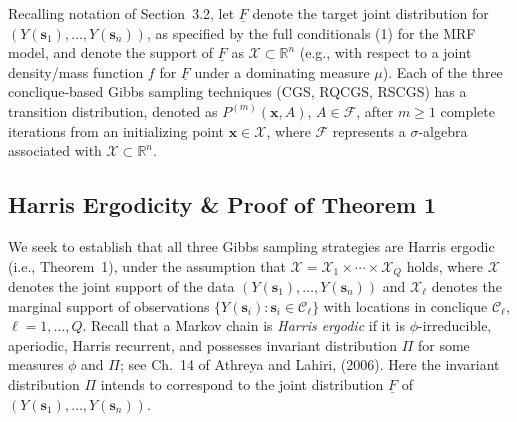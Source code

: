 \documentclass[12pt]{article}
\theoremstyle{definition}
\begin{document}
  Recalling   notation of Section~3.2, let $\underline{F}$ denote the target joint distribution  for $(Y(\boldsymbol s_1), \dots, Y(\boldsymbol s_n))$, as
specified by the full conditionals (1) for the MRF model, and denote the support  of  $\underline{F}$ as $\mathcal{X} \subset \mathbb{R}^n$   (e.g., with respect to a joint density/mass function $ f$ for $\underline{F}$  under a dominating measure $\mu$).
Each of the three conclique-based Gibbs sampling techniques (CGS, RQCGS, RSCGS) has a  transition distribution, denoted as  \(P^{(m)}(\boldsymbol  x, A)\), \(A\in\mathcal{F}\),  after \(m \geq 1\)
complete iterations from an initializing point \(\boldsymbol  x \in \mathcal{X}\),
where \(\mathcal{F}\) represents a  \(\sigma\)-algebra
associated with \(\mathcal{X}\subset \mathbb{R}^n\).



\subsection{Harris Ergodicity \& Proof of Theorem 1}\label{proof-1}
We seek to establish that all three Gibbs sampling strategies are Harris ergodic (i.e., Theorem~1), under the assumption that $\mathcal{X} = \mathcal{X}_1 \times \cdots \times \mathcal{X}_Q$ holds, where $\mathcal{X}$ denotes the joint support of the data $(Y(\boldsymbol{s}_1),\ldots,Y(\boldsymbol{s}_n))$ and $\mathcal{X}_\ell$ denotes the marginal support of
observations $\{Y(\boldsymbol{s}_i) : \boldsymbol{s}_i \in  \mathcal{C}_\ell \}$ with locations in conclique $\mathcal{C}_\ell$, $\ell=1,\ldots,Q$.  
Recall that a Markov chain is \emph{Harris ergodic} if it is
\(\phi\)-irreducible, aperiodic, Harris recurrent, and possesses
invariant distribution \(\Pi\) for some measures \(\phi\) and \(\Pi\); see Ch.~14 of Athreya and Lahiri, (2006).  Here
the invariant distribution $\Pi$ intends to correspond to
  the joint   distribution $\underline{F}$ of  $(Y(\boldsymbol s_1), \dots, Y(\boldsymbol s_n))$.
\end{document}
